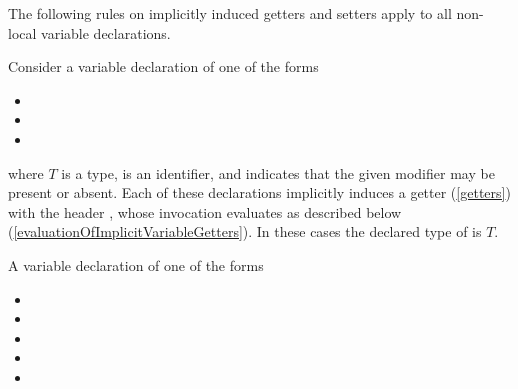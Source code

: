 \documentclass[makeidx]{article}
\begin{document}

\LMHash{}%
The following rules on implicitly induced getters and setters
apply to all non-local variable declarations.

\LMHash{}%
Consider a variable declaration of one of the forms

\begin{itemize}
\item {}
\item {}
\item {}
\end{itemize}

\noindent
where $T$ is a type, \id{} is an identifier,
and  indicates that the given modifier may be present or absent.
Each of these declarations implicitly induces a getter
(\ref{getters})
with the header ,
whose invocation evaluates as described below
(\ref{evaluationOfImplicitVariableGetters}).
In these cases the declared type of \id{} is $T$.
\EndCase

\LMHash{}%
A variable declaration of one of the forms

\begin{itemize}
\item {}
\item {}
\item {}
\item {}
\item {}
\end{itemize}
\end{document}

